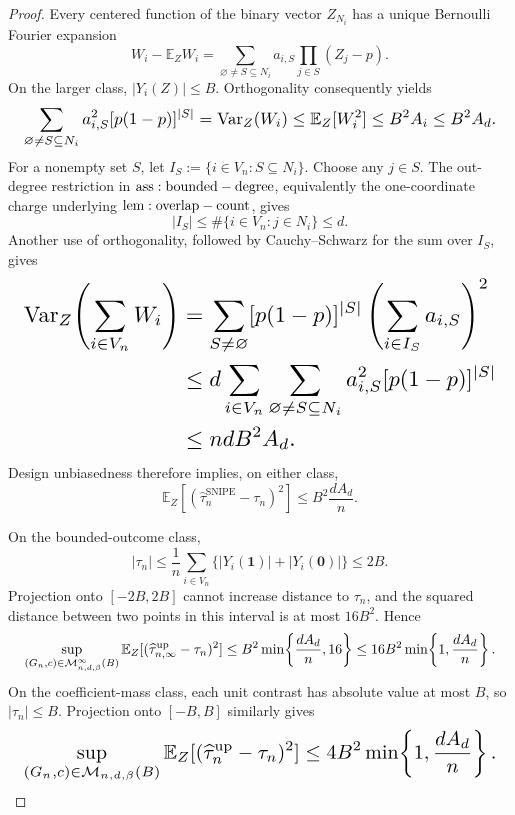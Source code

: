 \documentclass{article}
\begin{document}
\begin{proof}
Every centered function of the binary vector \(Z_{N_i}\) has a unique Bernoulli Fourier expansion
\[
W_i-\mathbb E_ZW_i
=\sum_{\varnothing\ne S\subseteq N_i}a_{i,S}
\prod_{j\in S}(Z_j-p).
\]
On the larger class, \(|Y_i(Z)|\le B\). Orthogonality consequently yields
\[
\makebox[\linewidth][c]{\resizebox{0.98\linewidth}{!}{\(\displaystyle \sum_{\varnothing\ne S\subseteq N_i}
a_{i,S}^2[p(1-p)]^{|S|}
=\operatorname{Var}_Z(W_i)
\le\mathbb E_Z[W_i^2]
\le B^2A_i
\le B^2A_d.\)}}
\]
For a nonempty set \(S\), let \(I_S:=\{i\in V_n:S\subseteq N_i\}\). Choose any \(j\in S\). The out-degree restriction in \({\rm ass:bounded-degree}\), equivalently the one-coordinate charge underlying \({\rm lem:overlap-count}\), gives
\[
|I_S|\le\#\{i\in V_n:j\in N_i\}\le d.
\]
Another use of orthogonality, followed by Cauchy--Schwarz for the sum over \(I_S\), gives
\[
\makebox[\linewidth][c]{\resizebox{0.98\linewidth}{!}{\(\displaystyle \begin{aligned}
\operatorname{Var}_Z\!\left(\sum_{i\in V_n}W_i\right)
&=\sum_{S\ne\varnothing}[p(1-p)]^{|S|}
\left(\sum_{i\in I_S}a_{i,S}\right)^2\\
&\le d\sum_{i\in V_n}
\sum_{\varnothing\ne S\subseteq N_i}
a_{i,S}^2[p(1-p)]^{|S|}\\
&\le ndB^2A_d.
\end{aligned}\)}}
\]
Design unbiasedness therefore implies, on either class,
\[
\mathbb E_Z[(\widehat\tau_n^{\mathrm{SNIPE}}-\tau_n)^2]
\le B^2\frac{dA_d}{n}.
\]

On the bounded-outcome class,
\[
|\tau_n|
\le\frac1n\sum_{i\in V_n}
\{|Y_i(\mathbf1)|+|Y_i(\mathbf0)|\}
\le2B.
\]
Projection onto \([-2B,2B]\) cannot increase distance to \(\tau_n\), and the squared distance between two points in this interval is at most \(16B^2\). Hence
\[
\makebox[\linewidth][c]{\resizebox{0.98\linewidth}{!}{\(\displaystyle \sup_{(G_n,c)\in\mathcal M_{n,d,\beta}^{\infty}(B)}
\mathbb E_Z[(\widehat\tau_{n,\infty}^{\mathrm{up}}-\tau_n)^2]
\le B^2\min\!\left\{\frac{dA_d}{n},16\right\}
\le16B^2\min\!\left\{1,\frac{dA_d}{n}\right\}.\)}}
\]
On the coefficient-mass class, each unit contrast has absolute value at most \(B\), so \(|\tau_n|\le B\). Projection onto \([-B,B]\) similarly gives
\[
\makebox[\linewidth][c]{\resizebox{0.98\linewidth}{!}{\(\displaystyle \sup_{(G_n,c)\in\mathcal M_{n,d,\beta}(B)}
\mathbb E_Z[(\widehat\tau_n^{\mathrm{up}}-\tau_n)^2]
\le4B^2\min\!\left\{1,\frac{dA_d}{n}\right\}.\)}}
\]


\end{proof}
\end{document}
